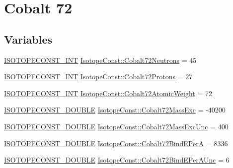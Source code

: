 \hypertarget{group___isotope_const-_cobalt-_co72}{}\section{Cobalt 72}
\label{group___isotope_const-_cobalt-_co72}
\subsection*{Variables}
\begin{DoxyCompactItemize}
\item 
\mbox{\hyperlink{group___isotope_const-_macros_ga5f18360b3e99483a35c32d789e62621c}{I\+S\+O\+T\+O\+P\+E\+C\+O\+N\+S\+T\+\_\+\+I\+NT}} \mbox{\hyperlink{group___isotope_const-_cobalt-_co72_ga798fca5c97687314a6dab0c2b3c5f617}{Isotope\+Const\+::\+Cobalt72\+Neutrons}} = 45
\item 
\mbox{\hyperlink{group___isotope_const-_macros_ga5f18360b3e99483a35c32d789e62621c}{I\+S\+O\+T\+O\+P\+E\+C\+O\+N\+S\+T\+\_\+\+I\+NT}} \mbox{\hyperlink{group___isotope_const-_cobalt-_co72_ga3d5356a6711016233ee565688a096d9d}{Isotope\+Const\+::\+Cobalt72\+Protons}} = 27
\item 
\mbox{\hyperlink{group___isotope_const-_macros_ga5f18360b3e99483a35c32d789e62621c}{I\+S\+O\+T\+O\+P\+E\+C\+O\+N\+S\+T\+\_\+\+I\+NT}} \mbox{\hyperlink{group___isotope_const-_cobalt-_co72_gae9b10897f1d5ac8c59aacc0845a3721a}{Isotope\+Const\+::\+Cobalt72\+Atomic\+Weight}} = 72
\item 
\mbox{\hyperlink{group___isotope_const-_macros_ga8f45a7272ce02c0b4c65c44636ed719a}{I\+S\+O\+T\+O\+P\+E\+C\+O\+N\+S\+T\+\_\+\+D\+O\+U\+B\+LE}} \mbox{\hyperlink{group___isotope_const-_cobalt-_co72_ga36fce50b2f7bc359e5a0f2c6b4f889be}{Isotope\+Const\+::\+Cobalt72\+Mass\+Exc}} = -\/40200
\item 
\mbox{\hyperlink{group___isotope_const-_macros_ga8f45a7272ce02c0b4c65c44636ed719a}{I\+S\+O\+T\+O\+P\+E\+C\+O\+N\+S\+T\+\_\+\+D\+O\+U\+B\+LE}} \mbox{\hyperlink{group___isotope_const-_cobalt-_co72_ga4b20baf23585b83d0dd0536390e4e052}{Isotope\+Const\+::\+Cobalt72\+Mass\+Exc\+Unc}} = 400
\item 
\mbox{\hyperlink{group___isotope_const-_macros_ga8f45a7272ce02c0b4c65c44636ed719a}{I\+S\+O\+T\+O\+P\+E\+C\+O\+N\+S\+T\+\_\+\+D\+O\+U\+B\+LE}} \mbox{\hyperlink{group___isotope_const-_cobalt-_co72_gaceef362ad98641a3be2a8e4990cb2648}{Isotope\+Const\+::\+Cobalt72\+Bind\+E\+PerA}} = 8336
\item 
\mbox{\hyperlink{group___isotope_const-_macros_ga8f45a7272ce02c0b4c65c44636ed719a}{I\+S\+O\+T\+O\+P\+E\+C\+O\+N\+S\+T\+\_\+\+D\+O\+U\+B\+LE}} \mbox{\hyperlink{group___isotope_const-_cobalt-_co72_ga4f759b68299690ebd5b30c801bae1f52}{Isotope\+Const\+::\+Cobalt72\+Bind\+E\+Per\+A\+Unc}} = 6

\end{DoxyCompactItemize}
